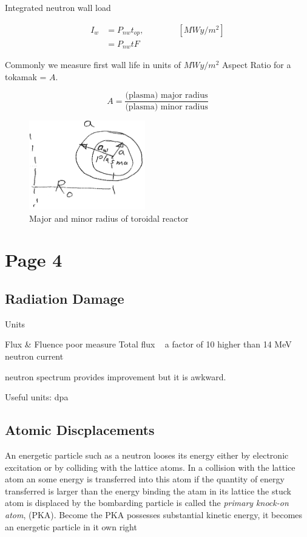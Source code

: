 \documentclass[11pt]{article}
\begin{document}
Integrated neutron wall load

\begin{align}
I_w &= P_{nw} t_{op},  \qquad \qquad [MW y/m^2]     \\
	&= P_{nw} t F
\end{align}

Commonly we measure first wall life in units of $MW y/m^2$
Aspect Ratio for a tokamak = $A$.

\begin{equation}
	A = \frac{\text{(plasma) major radius}}{\text{(plasma) minor radius}}
\end{equation}

\begin{figure}[!htp]
\centering
\includegraphics[width=0.45\textwidth]{figs/fig1.png}
\caption[width=\textwidth]{Major and minor radius of toroidal reactor}
\label{fig:reactorRadius}
\end{figure}

\section{Page 4}

\subsection{Radiation Damage}
Units

Flux \& Fluence poor measure
Total flux ~ a factor of 10 higher than 14 MeV neutron current

neutron spectrum provides improvement but it is awkward.

Useful units: dpa

\subsection{Atomic Discplacements}
An energetic particle such as a neutron looses its energy either by electronic excitation or by colliding with the lattice atoms. In a collision with the lattice atom an some energy is transferred into this atom if the quantity of energy transferred is larger than the energy binding the atam in its lattice the stuck atom is displaced by the bombarding particle is called the \textit{primary knock-on atom}, (PKA). Become the PKA possesses substantial kinetic energy, it becomes an energetic particle in it own right
\end{document}

